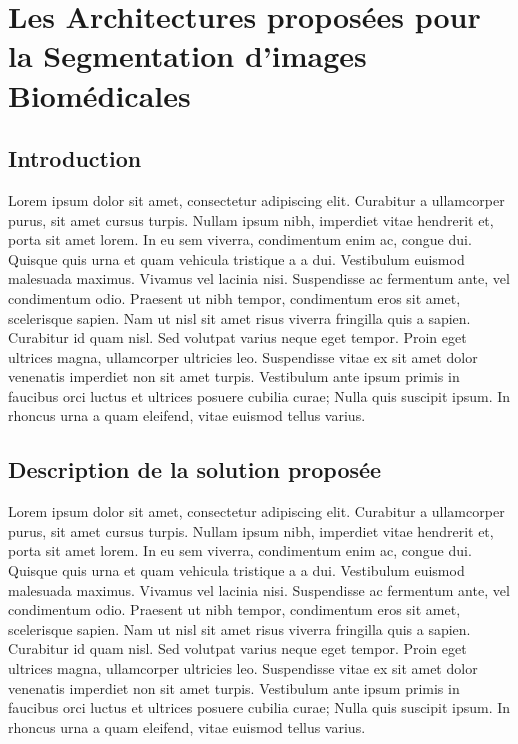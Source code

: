 \chapter{Les Architectures proposées pour la Segmentation d’images Biomédicales}


\section{Introduction}
Lorem ipsum dolor sit amet, consectetur adipiscing elit. Curabitur a ullamcorper purus, sit amet cursus turpis. Nullam ipsum nibh, imperdiet vitae hendrerit et, porta sit amet lorem. In eu sem viverra, condimentum enim ac, congue dui. Quisque quis urna et quam vehicula tristique a a dui. Vestibulum euismod malesuada maximus. Vivamus vel lacinia nisi. Suspendisse ac fermentum ante, vel condimentum odio. Praesent ut nibh tempor, condimentum eros sit amet, scelerisque sapien. Nam ut nisl sit amet risus viverra fringilla quis a sapien. Curabitur id quam nisl. Sed volutpat varius neque eget tempor. Proin eget ultrices magna, ullamcorper ultricies leo. Suspendisse vitae ex sit amet dolor venenatis imperdiet non sit amet turpis. Vestibulum ante ipsum primis in faucibus orci luctus et ultrices posuere cubilia curae; Nulla quis suscipit ipsum. In rhoncus urna a quam eleifend, vitae euismod tellus varius.
\newpage
\section{Description de la solution proposée}
Lorem ipsum dolor sit amet, consectetur adipiscing elit. Curabitur a ullamcorper purus, sit amet cursus turpis. Nullam ipsum nibh, imperdiet vitae hendrerit et, porta sit amet lorem. In eu sem viverra, condimentum enim ac, congue dui. Quisque quis urna et quam vehicula tristique a a dui. Vestibulum euismod malesuada maximus. Vivamus vel lacinia nisi. Suspendisse ac fermentum ante, vel condimentum odio. Praesent ut nibh tempor, condimentum eros sit amet, scelerisque sapien. Nam ut nisl sit amet risus viverra fringilla quis a sapien. Curabitur id quam nisl. Sed volutpat varius neque eget tempor. Proin eget ultrices magna, ullamcorper ultricies leo. Suspendisse vitae ex sit amet dolor venenatis imperdiet non sit amet turpis. Vestibulum ante ipsum primis in faucibus orci luctus et ultrices posuere cubilia curae; Nulla quis suscipit ipsum. In rhoncus urna a quam eleifend, vitae euismod tellus varius.
\vspace{10pt}

